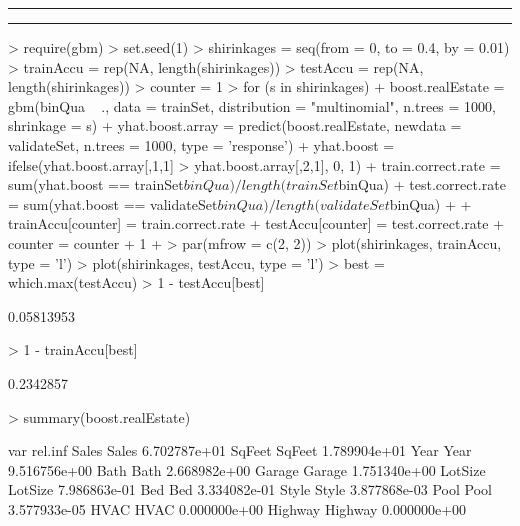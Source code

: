 \documentclass[a4paper]{article}
\newcommand{\question}[2] {\vspace{.25in} \hrule\vspace{0.5em}
\noindent{\bf #1: #2} \vspace{0.5em}
\hrule \vspace{.10in}}
\begin{document}
\newpage
\question{4}{Boosting}
\begin{Schunk}
\begin{Sinput}
> require(gbm)
> set.seed(1)
> shirinkages = seq(from = 0, to = 0.4, by = 0.01)
> trainAccu = rep(NA, length(shirinkages))
> testAccu = rep(NA, length(shirinkages))
> counter = 1
> for (s in shirinkages) {
+     boost.realEstate = gbm(binQua ~ ., data = trainSet, distribution = "multinomial", n.trees = 1000, shrinkage = s)
+     yhat.boost.array = predict(boost.realEstate, newdata = validateSet, n.trees = 1000, type = 'response')
+     yhat.boost = ifelse(yhat.boost.array[,1,1] > yhat.boost.array[,2,1], 0, 1)
+     train.correct.rate = sum(yhat.boost == trainSet$binQua) / length(trainSet$binQua)
+     test.correct.rate = sum(yhat.boost == validateSet$binQua) / length(validateSet$binQua)
+ 
+     trainAccu[counter] = train.correct.rate
+     testAccu[counter] = test.correct.rate
+     counter = counter + 1
+ }
> par(mfrow = c(2, 2))
> plot(shirinkages, trainAccu, type = 'l')
> plot(shirinkages, testAccu, type = 'l')
> best = which.max(testAccu)
> 1 - testAccu[best]
\end{Sinput}
\begin{Soutput}
[1] 0.05813953
\end{Soutput}
\begin{Sinput}
> 1 - trainAccu[best]
\end{Sinput}
\begin{Soutput}
[1] 0.2342857
\end{Soutput}
\begin{Sinput}
> summary(boost.realEstate)
\end{Sinput}
\begin{Soutput}
            var      rel.inf
Sales     Sales 6.702787e+01
SqFeet   SqFeet 1.789904e+01
Year       Year 9.516756e+00
Bath       Bath 2.668982e+00
Garage   Garage 1.751340e+00
LotSize LotSize 7.986863e-01
Bed         Bed 3.334082e-01
Style     Style 3.877868e-03
Pool       Pool 3.577933e-05
HVAC       HVAC 0.000000e+00
Highway Highway 0.000000e+00
\end{Soutput}
\end{Schunk}
\end{document}
